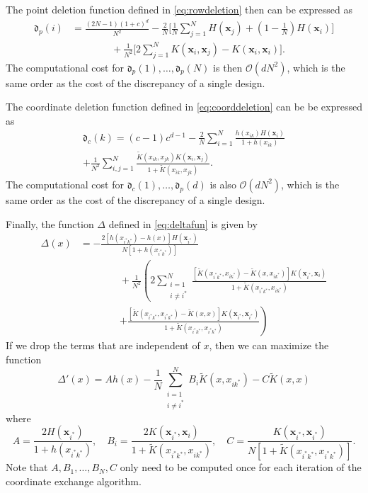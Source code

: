 \documentclass[graybox]{svmult}
\newcommand{\vx}{\boldsymbol{x}}
\newcommand{\frakd}{\mathfrak{d}}
\newcommand{\tK}{\widetilde{K}}
\newcommand{\Order}{\mathcal{O}}
\begin{document}
The point deletion function defined in \eqref{eq:rowdeletion} then can be expressed as
\begin{align}
\nonumber
\frakd_p(i) 
&= \frac{(2N-1)(1+c)^d}{N^2} - \frac{2}{N}\biggl[ \frac{1}{N} \sum_{j=1}^N  H(\vx_{j}) + \left(1 - \frac 1N \right) H(\vx_{i})  \biggr] \\
\label{eq:rowdeletionA}
& \qquad \qquad + \frac{1}{N^2}\biggl[2 \sum_{j=1}^N K(\vx_{i},\vx_{j})- K(\vx_{i},\vx_{i})\biggr]. 
\end{align}
The computational cost for $\frakd_p(1), \ldots, \frakd_p(N)$ is then $\Order(dN^2)$, which is the same order as the cost of the discrepancy of a single design.

The coordinate deletion function defined in \eqref{eq:coorddeletion} can be be expressed as
\begin{multline}\label{eq:coldeletionA}
\frakd_c(k) = (c-1)c^{d-1} -\frac{2}{N}\sum_{i=1}^N \frac{h(x_{ik})H(\vx_i)}{1+h(x_{ik})}  \\
+\frac{1}{N^2}\sum_{i,j=1}^N \frac{\tK(x_{ik},x_{jk}) K(\vx_i,\vx_j)}{1+\tK(x_{ik},x_{jk})}  .
\end{multline}
The computational cost for $\frakd_c(1), \ldots, \frakd_p(d)$ is also $\Order(dN^2)$, which is the same order as the cost of the discrepancy of a single design.


Finally, the  function $\Delta$ defined in \eqref{eq:deltafun} is given by
\begin{align}\label{eq:deltafunction}
\nonumber
\Delta(x)
&= -\frac{2\left[  h(x_{i^*k^*})-h(x)    \right]H(\vx_{i^*})}{N[1 + h(x_{i^*k^*})]}   \\
\nonumber
& \qquad \qquad +\frac{1}{N^2}\left(2\sum_{\substack{i=1 \\ i \ne i^*}}^N  \frac{[\tK(x_{i^*k^*},x_{ik^*})-\tK(x,x_{ik^*})] K(\vx_{i^*},\vx_i)} {1 + \tK(x_{i^*k^*},x_{ik^*})} \right . \\
& \qquad \qquad \left . + \frac{[\tK(x_{i^*k^*},x_{i^*k^*})-\tK(x,x)] K(\vx_{i^*},\vx_{i^*})} {1 + \tK(x_{i^*k^*},x_{i^*k^*})} \right )
\end{align} 
If we drop the terms that are independent of $x$, then we can maximize the function
\begin{equation}\label{eq:deltapfunction}
\Delta'(x) = Ah(x)  - \frac{1}{N}\sum_{\substack{i=1 \\ i \ne i^*}}^N B_i \tK(x,x_{ik^*}) - C \tK(x,x)
\end{equation}
where
\begin{equation*}
A = \frac{2H(\vx_{i^*})}{1 + h(x_{i^*k^*})}, \quad
B_i  = \frac{2K(\vx_{i^*},\vx_i)} {1 + \tK(x_{i^*k^*},x_{ik^*})}, \quad
C  = \frac{K(\vx_{i^*},\vx_{i^*})} {N[1 + \tK(x_{i^*k^*},x_{i^*k^*})]}.
\end{equation*}
Note that $A, B_1, \ldots, B_N, C$ only need to be computed once for each iteration of the coordinate exchange algorithm.
\end{document}
